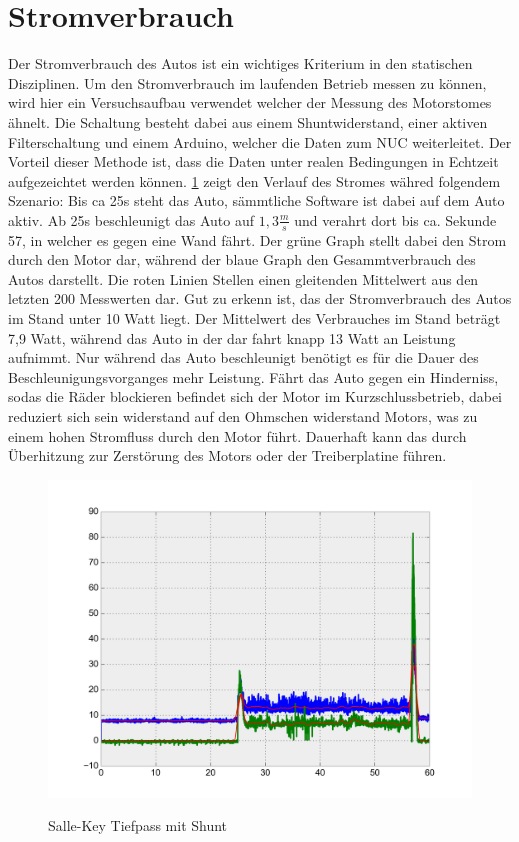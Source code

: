 \section{Stromverbrauch}

Der Stromverbrauch des Autos ist ein wichtiges Kriterium in den statischen Disziplinen. Um den Stromverbrauch im laufenden Betrieb messen zu können, wird hier ein Versuchsaufbau verwendet welcher der Messung des
Motorstomes ähnelt. Die Schaltung besteht dabei aus einem Shuntwiderstand, einer aktiven Filterschaltung und einem Arduino, welcher die Daten zum NUC weiterleitet. Der Vorteil dieser Methode ist, dass die Daten
unter realen Bedingungen in Echtzeit aufgezeichtet werden können. \cref{fig:Strom} zeigt den Verlauf des Stromes währed folgendem Szenario: Bis ca 25s steht das Auto, sämmtliche Software ist dabei auf 
dem Auto aktiv. Ab 25s beschleunigt das Auto auf $1,3\frac{m}{s}$ und verahrt dort bis ca. Sekunde 57, in welcher es gegen eine Wand fährt. Der grüne Graph stellt dabei den Strom durch den Motor dar, während
der blaue Graph den Gesammtverbrauch des Autos darstellt. Die roten Linien Stellen einen gleitenden Mittelwert aus den letzten 200 Messwerten dar. Gut zu erkenn ist, das der Stromverbrauch des Autos im Stand unter 
10 Watt liegt. Der Mittelwert des Verbrauches im Stand beträgt 7,9 Watt, während das Auto in der dar fahrt knapp 13 Watt an Leistung aufnimmt. Nur während das Auto beschleunigt benötigt es für die Dauer
des Beschleunigungsvorganges mehr Leistung. Fährt das Auto gegen ein Hinderniss, sodas die Räder blockieren befindet sich der Motor im Kurzschlussbetrieb, dabei reduziert sich sein widerstand auf den Ohmschen widerstand
Motors, was zu einem hohen Stromfluss durch den Motor führt. Dauerhaft kann das durch Überhitzung zur Zerstörung des Motors oder der Treiberplatine führen.


\begin{figure}[H]
\centering
\includegraphics[width=.8\textwidth]{Strom/Power.png}\\
\caption{Salle-Key Tiefpass mit Shunt}%
\label{fig:Strom}
\end{figure}






